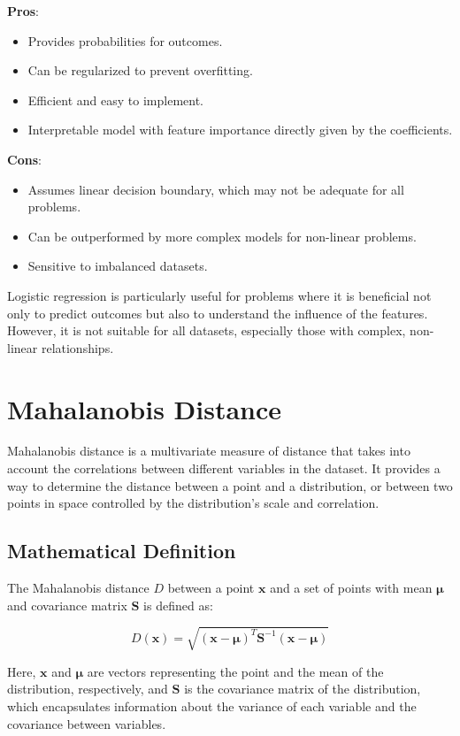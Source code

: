 \documentclass[12pt]{article}
\begin{document}
\textbf{Pros}:
\begin{itemize}
    \item Provides probabilities for outcomes.
    \item Can be regularized to prevent overfitting.
    \item Efficient and easy to implement.
    \item Interpretable model with feature importance directly given by the coefficients.
\end{itemize}

\textbf{Cons}:
\begin{itemize}
    \item Assumes linear decision boundary, which may not be adequate for all problems.
    \item Can be outperformed by more complex models for non-linear problems.
    \item Sensitive to imbalanced datasets.
\end{itemize}

Logistic regression is particularly useful for problems where it is beneficial not only to predict outcomes but also to understand the influence of the features. However, it is not suitable for all datasets, especially those with complex, non-linear relationships.

\section{Mahalanobis Distance}

Mahalanobis distance is a multivariate measure of distance that takes into account the correlations between different variables in the dataset. It provides a way to determine the distance between a point and a distribution, or between two points in space controlled by the distribution's scale and correlation.

\subsection{Mathematical Definition}

The Mahalanobis distance \(D\) between a point \( \mathbf{x} \) and a set of points with mean \( \boldsymbol{\mu} \) and covariance matrix \( \mathbf{S} \) is defined as:

\[ D(\mathbf{x}) = \sqrt{(\mathbf{x} - \boldsymbol{\mu})^T \mathbf{S}^{-1} (\mathbf{x} - \boldsymbol{\mu})} \]

Here, \( \mathbf{x} \) and \( \boldsymbol{\mu} \) are vectors representing the point and the mean of the distribution, respectively, and \( \mathbf{S} \) is the covariance matrix of the distribution, which encapsulates information about the variance of each variable and the covariance between variables.
\end{document}
